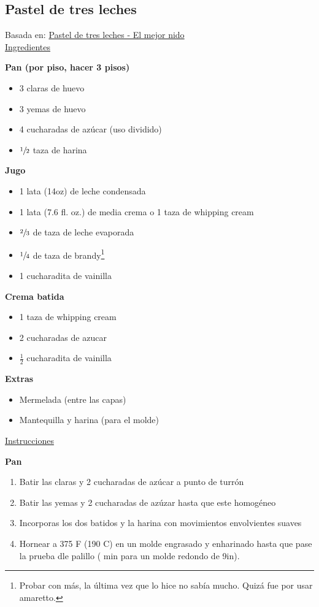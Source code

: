 \subsection{Pastel de tres leches}

Basada en: \href{https://www.elmejornido.com/es/recetas/pastel-tres-leches-121630}{Pastel de tres leches - El mejor nido}\\

\underline{Ingredientes}

\textbf{Pan (por piso, hacer 3 pisos)}

\begin{itemize}
\item 3 claras de huevo
\item 3 yemas de huevo
\item 4 cucharadas de az\'ucar (uso dividido)
\item $\sfrac{1}{2}$ taza de harina 
\end{itemize}

\textbf{Jugo}

\begin{itemize}
\item 1 lata (14oz) de leche condensada
\item 1 lata (7.6 fl. oz.) de media crema o 1 taza de whipping cream
\item $\sfrac{2}{3}$ de taza de leche evaporada
\item $\sfrac{1}{4}$ de taza de brandy\footnote{Probar con más, la última vez que lo hice no sabía mucho. Quizá fue por usar amaretto.}
\item 1 cucharadita de vainilla
\end{itemize}

\textbf{Crema batida}

\begin{itemize}
\item 1 taza de whipping cream
\item 2 cucharadas de azucar
\item $\frac{1}{2}$ cucharadita de vainilla
\end{itemize}

\textbf{Extras}
\begin{itemize}
\item Mermelada (entre las capas)
\item Mantequilla y harina (para el molde)
\end{itemize}

\underline{Instrucciones}

\textbf{Pan}
\begin{enumerate}
\item Batir las claras y 2 cucharadas de az\'ucar a punto de turrón
\item Batir las yemas y 2 cucharadas de az\'uzar hasta que este homog\'eneo
\item Incorporas los dos batidos y la harina con movimientos envolvientes suaves
\item Hornear a 375 F (190 C) en un molde engrasado y enharinado hasta que pase la prueba dle palillo ( min para un molde redondo de 9in).
\end{enumerate}

